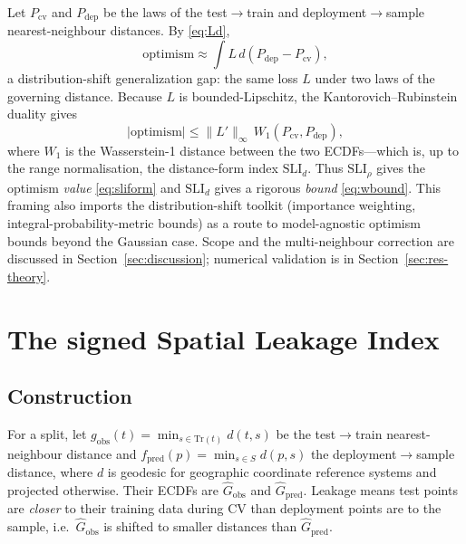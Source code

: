 \documentclass[11pt,a4paper]{article}
\newcommand{\SLI}{\mathrm{SLI}}
\newcommand{\SLIrho}{\SLI_{\rho}}
\newcommand{\SLId}{\SLI_{d}}
\newcommand{\Gobs}{\widehat{G}_{\mathrm{obs}}}
\newcommand{\Gpred}{\widehat{G}_{\mathrm{pred}}}
\begin{document}
Let $P_{\text{cv}}$ and $P_{\text{dep}}$ be the laws of the test$\to$train and
deployment$\to$sample nearest-neighbour distances. By \eqref{eq:Ld},
\begin{equation}
\text{optimism}\approx \int L\, d(P_{\text{dep}}-P_{\text{cv}}),
\end{equation}
a distribution-shift generalization gap: the same loss $L$ under two laws of the
governing distance. Because $L$ is bounded-Lipschitz, the
Kantorovich--Rubinstein duality \citep{villani2009optimal} gives
\begin{equation}\label{eq:wbound}
\lvert\text{optimism}\rvert \le \lVert L'\rVert_\infty\, W_1(P_{\text{cv}},P_{\text{dep}}),
\end{equation}
where $W_1$ is the Wasserstein-1 distance between the two ECDFs---which is, up to the
range normalisation, the distance-form index $\SLId$. Thus $\SLIrho$ gives the
optimism \emph{value} \eqref{eq:sliform} and $\SLId$ gives a rigorous \emph{bound}
\eqref{eq:wbound}. This framing also imports the distribution-shift toolkit
(importance weighting, integral-probability-metric bounds) as a route to
model-agnostic optimism bounds beyond the Gaussian case. Scope and the
multi-neighbour correction are discussed in Section~\ref{sec:discussion}; numerical
validation is in Section~\ref{sec:res-theory}.

\section{The signed Spatial Leakage Index}\label{sec:sli}

\subsection{Construction}

For a split, let $g_{\text{obs}}(t)=\min_{s\in\mathrm{Tr}(t)} d(t,s)$ be the
test$\to$train nearest-neighbour distance and $f_{\text{pred}}(p)=\min_{s\in S}
d(p,s)$ the deployment$\to$sample distance, where $d$ is geodesic for geographic
coordinate reference systems and projected otherwise. Their ECDFs are $\Gobs$ and
$\Gpred$. Leakage means test points are \emph{closer} to their training data during
CV than deployment points are to the sample, i.e.\ $\Gobs$ is shifted to smaller
distances than $\Gpred$.
\end{document}
